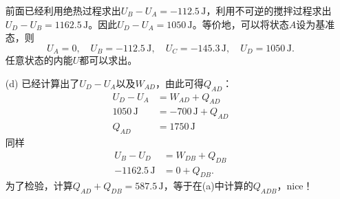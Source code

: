 \begin{enumerate}
		前面已经利用绝热过程求出$U_B - U_A = -112.5 \,\mathrm{J}$，利用不可逆的搅拌过程求出$U_D - U_B = 1162.5 \,\mathrm{J}$。因此$U_D - U_A = 1050 \,\mathrm{J}$。等价地，可以将状态$A$设为基准态，则
		\[
			U_A = 0, \quad U_B = -112.5 \,\mathrm{J}, \quad U_C = -145.3 \,\mathrm{J}, \quad U_D = 1050 \,\mathrm{J}.
		\]
	任意状态的内能$U$都可以求出。
	\item[(d)]
		已经计算出了$U_D - U_A$以及$W_{AD}$，由此可得$Q_{AD}$：
		\begin{align*}
			U_D - U_A &= W_{AD} + Q_{AD} \\
			1050 \,\mathrm{J} &= -700 \,\mathrm{J} + Q_{AD} \\
			Q_{AD} &= 1750 \,\mathrm{J}
		\end{align*}
		同样
		\begin{align*}
			U_B - U_D &= W_{DB} + Q_{DB} \\
			-1162.5 \,\mathrm{J} &= 0 + Q_{DB}.
		\end{align*}
		为了检验，计算$Q_{AD} + Q_{DB} = 587.5 \,\mathrm{J}$，等于在(a)中计算的$Q_{ADB}$，nice！
\end{enumerate}

